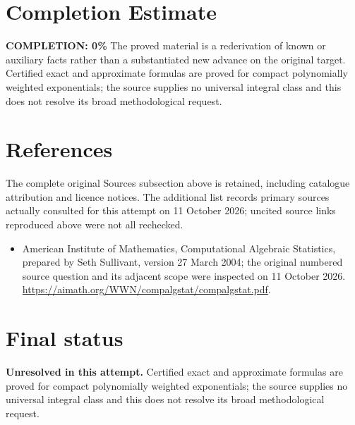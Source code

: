 \documentclass[11pt]{article}
\begin{document}
\section{Completion Estimate}
\noindent\textbf{COMPLETION: 0\%}
The proved material is a rederivation of known or auxiliary facts rather than a substantiated new advance on the original target. Certified exact and approximate formulas are proved for compact polynomially weighted exponentials; the source supplies no universal integral class and this does not resolve its broad methodological request.
\section{References}
The complete original Sources subsection above is retained, including catalogue attribution and licence notices. The additional list records primary sources actually consulted for this attempt on 11 October 2026; uncited source links reproduced above were not all rechecked.
\begin{itemize}
\item American Institute of Mathematics, Computational Algebraic Statistics, prepared by Seth Sullivant, version 27 March 2004; the original numbered source question and its adjacent scope were inspected on 11 October 2026. \url{https://aimath.org/WWN/compalgstat/compalgstat.pdf}.
\end{itemize}
\section{Final status}
\textbf{Unresolved in this attempt.} Certified exact and approximate formulas are proved for compact polynomially weighted exponentials; the source supplies no universal integral class and this does not resolve its broad methodological request.
\end{document}
